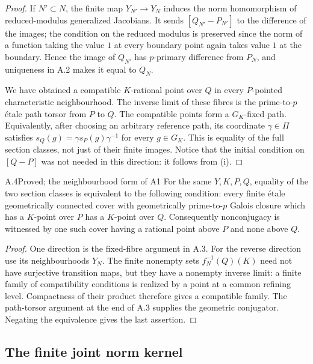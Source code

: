 \begin{proof}
If $N'\subset N$, the finite map $Y_{N'}\to Y_N$ induces the norm
homomorphism of reduced-modulus generalized Jacobians. It sends
$[Q_{N'}-P_{N'}]$ to the difference of the images; the condition
on the reduced modulus is preserved since the norm of a function
taking the value $1$ at every boundary point again takes value $1$
at the boundary. Hence the image of $Q_{N'}$ has $p$-primary
difference from $P_N$, and uniqueness in A.2 makes it equal to
$Q_N$.

We have obtained a compatible $K$-rational point over $Q$ in every
$P$-pointed characteristic neighbourhood. The inverse limit of
these fibres is the prime-to-$p$ \'etale path torsor from $P$ to $Q$.
The compatible points form a $G_K$-fixed path. Equivalently, after
choosing an arbitrary reference path, its coordinate
$\gamma\in\Pi$ satisfies
$s_Q(g)=\gamma s_P(g)\gamma^{-1}$ for every $g\in G_K$.
This is equality of the full section classes, not just of their
finite images. Notice that the initial condition on $[Q-P]$ was
not needed in this direction: it follows from (i).
\end{proof}

\begin{claim}{A.4}{Proved; the neighbourhood form of A1}
For the same $Y,K,P,Q$, equality of the two section classes is
equivalent to the following condition: every finite \'etale
geometrically connected cover with geometrically prime-to-$p$
Galois closure which has a $K$-point over $P$ has a $K$-point over
$Q$. Consequently nonconjugacy is witnessed by one such cover
having a rational point above $P$ and none above $Q$.
\end{claim}
\begin{proof}
One direction is the fixed-fibre argument in A.3. For the reverse
direction use its neighbourhoods $Y_N$. The finite nonempty sets
$f_N^{-1}(Q)(K)$ need not have surjective transition maps, but they
have a nonempty inverse limit: a finite family of compatibility
conditions is realized by a point at a common refining level.
Compactness of their product therefore gives a compatible family.
The path-torsor argument at the end of A.3 supplies the geometric
conjugator. Negating the equivalence gives the last assertion.
\end{proof}

\subsection{The finite joint norm kernel}

